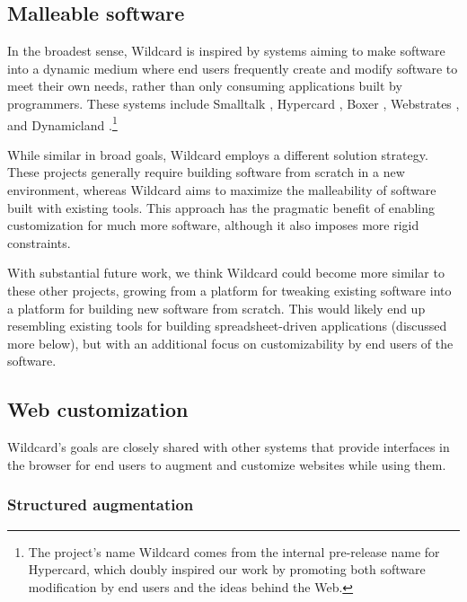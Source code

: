 \documentclass[english,submission]{programming}
\begin{document}
\hypertarget{malleable-software}{%
\subsection{Malleable software}\label{malleable-software}}

In the broadest sense, Wildcard is inspired by systems aiming to make
software into a dynamic medium where end users frequently create and
modify software to meet their own needs, rather than only consuming
applications built by programmers. These systems include Smalltalk
\autocite{kay1977}, Hypercard \autocite{hypercard2019} , Boxer
\autocite{disessa1986}, Webstrates \autocite{klokmose2015}, and
Dynamicland \autocite{victor}.\footnote{The project's name Wildcard
  comes from the internal pre-release name for Hypercard, which doubly
  inspired our work by promoting both software modification by end users
  and the ideas behind the Web.}

While similar in broad goals, Wildcard employs a different solution
strategy. These projects generally require building software from
scratch in a new environment, whereas Wildcard aims to maximize the
malleability of software built with existing tools. This approach has
the pragmatic benefit of enabling customization for much more software,
although it also imposes more rigid constraints.

With substantial future work, we think Wildcard could become more
similar to these other projects, growing from a platform for tweaking
existing software into a platform for building new software from
scratch. This would likely end up resembling existing tools for building
spreadsheet-driven applications (discussed more below), but with an
additional focus on customizability by end users of the software.

\hypertarget{web-customization}{%
\subsection{Web customization}\label{web-customization}}

Wildcard's goals are closely shared with other systems that provide
interfaces in the browser for end users to augment and customize
websites while using them.

\hypertarget{structured-augmentation}{%
\subsubsection{Structured augmentation}\label{structured-augmentation}}
\end{document}
